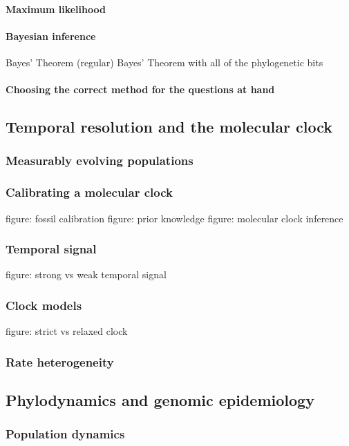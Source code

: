         \paragraph*{Maximum likelihood}
        \paragraph*{Bayesian inference}
        Bayes' Theorem (regular)
        Bayes' Theorem with all of the phylogenetic bits
        \paragraph*{Choosing the correct method for the questions at hand}

    \subsection{Temporal resolution and the molecular clock}
      \subsubsection{Measurably evolving populations}
      \subsubsection{Calibrating a molecular clock}
      figure: fossil calibration
      figure: prior knowledge
      figure: molecular clock inference
      \subsubsection{Temporal signal}
      figure: strong vs weak temporal signal
      \subsubsection{Clock models}
      figure: strict vs relaxed clock
      \subsubsection{Rate heterogeneity}
    \subsection{Phylodynamics and genomic epidemiology}
      \subsubsection{Population dynamics}
